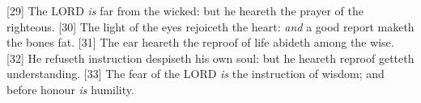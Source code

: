 [29] \textcolor[cmyk]{0.99998,1,0,0}{The LORD \emph{is} far from the wicked: but he heareth the prayer of the righteous.}
[30] \textcolor[cmyk]{0.99998,1,0,0}{The light of the eyes rejoiceth the heart: \emph{and} a good report maketh the bones fat.}
[31] \textcolor[cmyk]{0.99998,1,0,0}{The ear  heareth the reproof of life abideth among the wise.}
[32] \textcolor[cmyk]{0.99998,1,0,0}{He  refuseth instruction despiseth his own soul: but he  heareth reproof getteth understanding.}
[33] \textcolor[cmyk]{0.99998,1,0,0}{The fear of the LORD \emph{is} the instruction of wisdom; and before honour \emph{is} humility.}



